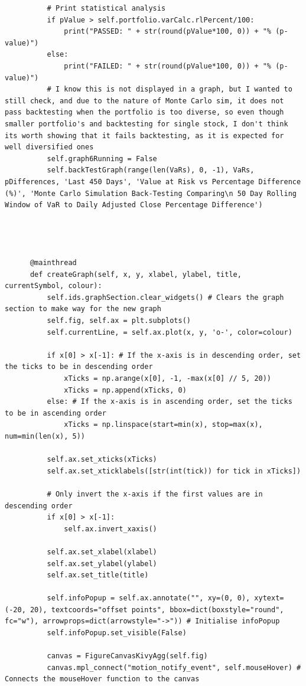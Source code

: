 \documentclass{article}
\begin{document}
\begin{verbatim}
          # Print statistical analysis
          if pValue > self.portfolio.varCalc.rlPercent/100:
              print("PASSED: " + str(round(pValue*100, 0)) + "% (p-value)")
          else:
              print("FAILED: " + str(round(pValue*100, 0)) + "% (p-value)")
          # I know this is not displayed in a graph, but I wanted to still check, and due to the nature of Monte Carlo sim, it does not pass backtesting when the portfolio is too diverse, so even though smaller portfolio's and backtesting for single stock, I don't think its worth showing that it fails backtesting, as it is expected for well diversified ones
          self.graph6Running = False
          self.backTestGraph(range(len(VaRs), 0, -1), VaRs, pDifferences, 'Last 450 Days', 'Value at Risk vs Percentage Difference (%)', 'Monte Carlo Simulation Back-Testing Comparing\n 50 Day Rolling Window of VaR to Daily Adjusted Close Percentage Difference')




      @mainthread
      def createGraph(self, x, y, xlabel, ylabel, title, currentSymbol, colour):
          self.ids.graphSection.clear_widgets() # Clears the graph section to make way for the new graph
          self.fig, self.ax = plt.subplots()
          self.currentLine, = self.ax.plot(x, y, 'o-', color=colour)

          if x[0] > x[-1]: # If the x-axis is in descending order, set the ticks to be in descending order
              xTicks = np.arange(x[0], -1, -max(x[0] // 5, 20)) 
              xTicks = np.append(xTicks, 0) 
          else: # If the x-axis is in ascending order, set the ticks to be in ascending order
              xTicks = np.linspace(start=min(x), stop=max(x), num=min(len(x), 5))

          self.ax.set_xticks(xTicks)
          self.ax.set_xticklabels([str(int(tick)) for tick in xTicks])

          # Only invert the x-axis if the first values are in descending order
          if x[0] > x[-1]:
              self.ax.invert_xaxis()

          self.ax.set_xlabel(xlabel)
          self.ax.set_ylabel(ylabel)
          self.ax.set_title(title)
          
          self.infoPopup = self.ax.annotate("", xy=(0, 0), xytext=(-20, 20), textcoords="offset points", bbox=dict(boxstyle="round", fc="w"), arrowprops=dict(arrowstyle="->")) # Initialise infoPopup
          self.infoPopup.set_visible(False)

          canvas = FigureCanvasKivyAgg(self.fig) 
          canvas.mpl_connect("motion_notify_event", self.mouseHover) # Connects the mouseHover function to the canvas


\end{verbatim}
\end{document}
